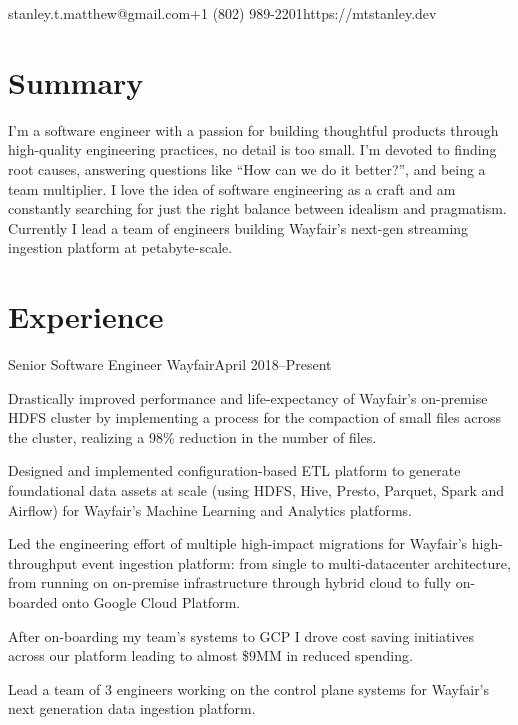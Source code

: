\documentclass[10pt]{resume}
\begin{document}

\vspace{0.5em}
{stanley.t.matthew@gmail.com}{+1 (802) 989-2201}{https://mtstanley.dev}

\section{Summary}

I'm a software engineer with a passion for building thoughtful products through
high-quality engineering practices, no detail is too small. I'm devoted to
finding root causes, answering questions like ``How can we do it better?'', and
being a team multiplier. I love the idea of software engineering as a craft and
am constantly searching for just the right balance between idealism and
pragmatism. Currently I lead a team of engineers building Wayfair's next-gen
streaming ingestion platform at petabyte-scale.

\section{Experience}

\expblock
{Senior Software Engineer \textnormal{Wayfair}}{April 2018--Present}
{

    \item Drastically improved performance and life-expectancy of Wayfair's
        on-premise HDFS cluster by implementing a process for the compaction of
        small files across the cluster, realizing a 98\% reduction in the
        number of files.

    \item Designed and implemented configuration-based ETL platform to generate
        foundational data assets at scale (using HDFS, Hive, Presto, Parquet,
        Spark and Airflow) for Wayfair's Machine Learning and Analytics
        platforms.

    \item Led the engineering effort of multiple high-impact migrations for
        Wayfair's high-throughput event ingestion platform: from single to
        multi-datacenter architecture, from running on on-premise
        infrastructure through hybrid cloud to fully on-boarded onto Google
        Cloud Platform.

    \item After on-boarding my team's systems to GCP I drove cost saving
        initiatives across our platform leading to almost \$9MM in reduced
        spending.

    \item Lead a team of 3 engineers working on the control plane systems for
        Wayfair's next generation data ingestion platform.

}
\end{document}
